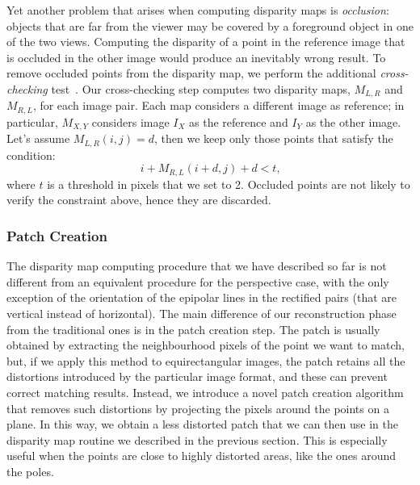 Yet another problem that arises when computing disparity maps is
\emph{occlusion}: objects that are far from the viewer may be covered by a
foreground object in one of the two views.
Computing the disparity of a point in the reference image that is occluded in
the other image would produce an inevitably wrong result.
To remove occluded points from the disparity map, we perform the additional
\emph{cross-checking} test~\cite{BMVC.25.14:abbreviated}.
Our cross-checking step computes two disparity maps, $M_{L,R}$ and $M_{R,L}$,
for each image pair. Each map considers a different image as reference;
in particular, $M_{X,Y}$ considers image $I_X$ as the reference and $I_Y$ as the
other image. Let's assume $M_{L,R}(i, j) = d$, then we keep only those points
that satisfy the condition:
%
\begin{equation*}
	i + M_{R, L}(i + d, j) + d< t \text{,}
\end{equation*}
%
\noindent where $t$ is a threshold in pixels that we set to 2.
Occluded points are not likely to verify the constraint above, hence they are
discarded.
\subsubsection{Patch Creation}
\label{subsubsec:patch_creation}
The disparity map computing procedure that we have described so far is not
different from an equivalent procedure for the perspective case,
with the only exception of the orientation of the epipolar lines in the
rectified pairs (that are vertical instead of horizontal).
The main difference of our reconstruction phase from the traditional ones is
in the patch creation step.
The patch is usually obtained by extracting the neighbourhood pixels of the point we want
to match, but, if we apply this method to equirectangular images, the patch retains all
the distortions introduced by the particular image format, and these can prevent
correct matching results.
Instead, we introduce a novel patch creation algorithm that removes such
distortions by projecting the pixels around the points on a plane.
In this way, we obtain a less distorted patch that we can then use in the
disparity map routine we described in the previous section.
This is especially useful when the points are close to highly distorted areas,
like the ones around the poles.

